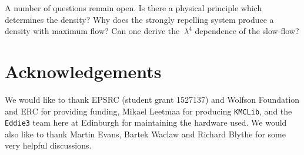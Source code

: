\documentclass[
reprint, amsmath,amssymb,
]{revtex4-1}
\begin{document}
A number of questions remain open. Is there a physical principle which
determines the density?  Why does the strongly repelling system
produce a density with maximum flow?  Can one derive the $~\lambda^4$
dependence of the slow-flow?

\section*{Acknowledgements}
We would like to thank EPSRC (student grant 1527137) and Wolfson
Foundation and ERC for providing funding, Mikael Leetmaa for producing
\texttt{KMCLib}, and the \texttt{Eddie3} team here at Edinburgh for
maintaining the hardware used.  We would also like to thank Martin
Evans, Bartek Waclaw and Richard Blythe for some very helpful
discussions.


\end{document}
